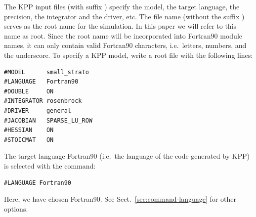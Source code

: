 \documentclass[twoside]{article}
\newcommand{\kpproot}{{\sc root}}
\begin{document}
The KPP input files (with suffix ) specify the model, the target
language, the precision, the integrator and the driver, etc. The file name
(without the suffix ) serves as the root name for the simulation.
In this paper we will refer to this name as \kpproot. Since the root name
will be incorporated into Fortran90 module names, it can only contain
valid Fortran90 characters, i.e.\ letters, numbers, and the underscore. To
specify a KPP model, write a \kpproot{} file with the following
lines:
%
\begin{verbatim}
#MODEL      small_strato
#LANGUAGE   Fortran90
#DOUBLE     ON
#INTEGRATOR rosenbrock
#DRIVER     general
#JACOBIAN   SPARSE_LU_ROW
#HESSIAN    ON
#STOICMAT   ON
\end{verbatim}
%
The target language Fortran90 (i.e.\ the language of the code generated
by KPP) is selected with the command:
%
\begin{verbatim}
#LANGUAGE Fortran90
\end{verbatim}
%
Here, we have chosen Fortran90. See Sect.~\ref{sec:command-language} for
other options.
\end{document}
